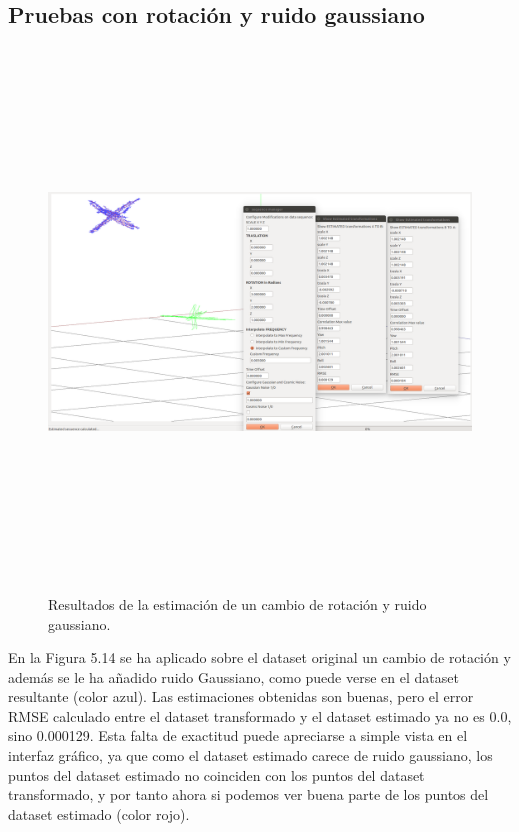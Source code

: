 \subsection{Pruebas con rotación y ruido gaussiano}
\begin{figure}[H]
\begin{center}
\label{fig:opciones de View}\includegraphics[height=14.0cm,width=18.0cm]{img/cap6/Rota_GaussNoise_abba.png}
\hspace{0.5cm}

\end{center}

\caption{Resultados de la estimación de un cambio de rotación y ruido gaussiano.}
\end{figure}
En la Figura 5.14 se ha aplicado sobre el dataset original un cambio de rotación y además se le ha añadido ruido Gaussiano, como puede verse en el dataset resultante (color azul). Las estimaciones obtenidas son buenas, pero el error RMSE calculado entre el dataset transformado y el dataset estimado ya no es 0.0, sino 0.000129. Esta falta de exactitud puede apreciarse a simple vista en el interfaz gráfico, ya que como el dataset estimado carece de ruido gaussiano, los puntos del dataset estimado no coinciden con los puntos del dataset transformado, y por tanto ahora si podemos ver buena parte de los puntos del dataset estimado (color rojo).


